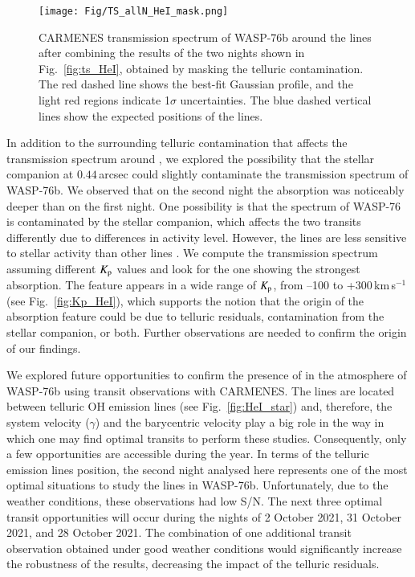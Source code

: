 \documentclass{aa}
\begin{document}
\begin{figure}[]
\centering
\texttt{[image: Fig/TS\_allN\_HeI\_mask.png]}
\caption{CARMENES transmission spectrum of WASP-76b around the  lines after combining the results of the two nights shown in Fig.~\ref{fig:ts_HeI}, obtained by masking the telluric contamination. The red dashed line shows the best-fit Gaussian profile, and the light red regions indicate 1$\sigma$ uncertainties. The blue dashed vertical lines show the expected positions of the  lines.}
\label{fig:ts_HeI_comb}
\end{figure}


In addition to the surrounding telluric contamination that affects the transmission spectrum around , we explored the possibility that the stellar companion at $0.44$\,arcsec \citep{Southworth2020} could slightly contaminate the transmission spectrum of WASP-76b. We observed that on the second night the absorption was noticeably deeper than on the first night. One possibility is that the spectrum of WASP-76 is contaminated by the stellar companion, 
which affects the two transits differently due to differences in activity level. 
However, the  lines are less sensitive to stellar activity than other lines \citep{Cauley2018}. We compute the transmission spectrum assuming different $K_{\rm p}$ values and look for the one showing the strongest absorption. The feature appears in a wide range of $K_{\rm p}$, from --100 to +300\,km\,s$^{-1}$ (see Fig.~\ref{fig:Kp_HeI}), which supports the notion that the origin of the  absorption feature could be due to telluric residuals, contamination from the stellar companion, or both. Further observations are needed to confirm the origin of our findings.  


We explored future opportunities to confirm the presence of  in the atmosphere of WASP-76b using transit observations with CARMENES. The  lines are located between telluric OH emission lines (see Fig.~\ref{fig:HeI_star}) and, therefore, the system velocity ($\gamma$) and the barycentric velocity play a big role in the way in which one may find optimal transits to perform these studies. Consequently, only a few opportunities are accessible during the year. In terms of the telluric emission lines position, the second night analysed here represents one of the most optimal situations to study the  lines in WASP-76b. Unfortunately, due to the weather conditions, these observations had low S/N. The next three optimal transit opportunities will occur during the nights of 2 October 2021, 31 October 2021, and 28 October 2021. The combination of one additional transit observation obtained under good weather conditions would significantly increase the robustness of the results, decreasing the impact of the telluric residuals.
\end{document}
